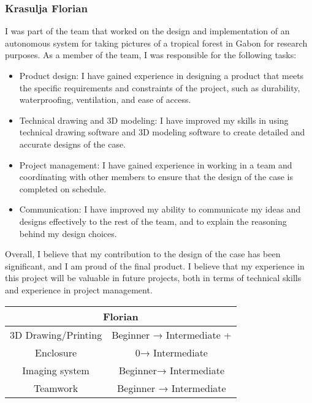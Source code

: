 \newpage
\subsubsection*{Krasulja Florian}
I was part of the team that worked on the design and implementation of an autonomous system for taking pictures of a tropical forest in Gabon for research purposes. As a member of the team, I was responsible for the following tasks:

\begin{itemize}
    \item Product design: I have gained experience in designing a product that meets the specific requirements and constraints of the project, such as durability, waterproofing, ventilation, and ease of access.
    \item Technical drawing and 3D modeling: I have improved my skills in using technical drawing software and 3D modeling software to create detailed and accurate designs of the case.
    \item Project management: I have gained experience in working in a team and coordinating with other members to ensure that the design of the case is completed on schedule.
    \item Communication: I have improved my ability to communicate my ideas and designs effectively to the rest of the team, and to explain the reasoning behind my design choices.
\end{itemize}

Overall, I believe that my contribution to the design of the case has been significant, and I am proud of the final product. I believe that my experience in this project will be valuable in future projects, both in terms of technical skills and experience in project management.\\

\begin{table}[!h]
    \centering
    \begin{tabular}{|cc|}
    \hline
    \multicolumn{2}{|c|}{\cellcolor[HTML]{9698ED}Florian}                 \\ \hline
    \multicolumn{1}{|c|}{3D Drawing/Printing} & Beginner → Intermediate + \\ \hline
    \multicolumn{1}{|c|}{Enclosure}           & 0→ Intermediate           \\ \hline
    \multicolumn{1}{|c|}{Imaging system}      & Beginner→ Intermediate    \\ \hline
    \multicolumn{1}{|c|}{Teamwork}            & Beginner → Intermediate   \\ \hline
    \end{tabular}
\end{table}